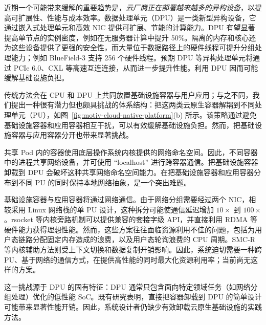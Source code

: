 近期一个可能带来缓解的重要趋势是，\emph{云厂商正在部署越来越多的异构设备}，以提高可扩展性、性能与成本效率\cite{amazon-f1,silberstein2013gpufs,kim2014gpunet,firestone2018azure,china-mobile-smartnic,huawei-smartnic,xilinx-fpga-huawei,ali-fpga,baidu-fpga}。数据处理单元（DPU）是一类新型异构设备，它通过嵌入式处理单元和高效 NIC 提供可扩展、节能的计算能力\cite{234944}。DPU 有望显著提高单节点的实例密度，例如在无服务器计算中提升 50\%\cite{10.1145/3503222.3507732}。隔离的内存和核心还为这些设备提供了更强的安全性，而大量位于数据路径上的硬件线程可提升分组处理能力；例如 BlueField-3 支持 256 个硬件线程\cite{bf-3}。预期 DPU 等异构处理单元将通过 PCIe 6.0、CXL\cite{intel-cxl} 等高速互连连接，从而进一步提升性能。利用 DPU 因而可能缓解基础设施负担。

传统方法会在 CPU 和 DPU 上共同放置基础设施容器与用户应用\cite{redhat-openshift}；与之不同，我们提出一种很有潜力但也颇具挑战的体系结构：把这两类云原生容器解耦到不同处理单元（PU），如图~\ref{fig:motiv-cloud-native-platform}(b) 所示。该策略通过避免基础设施容器和应用容器相互干扰，可以有效缓解基础设施负担。然而，把基础设施容器与应用容器分开也带来显著挑战。

共享 Pod 内的容器使用底层操作系统内核提供的网络命名空间。因此，不同容器中的进程共享网络设备，并可使用 ``localhost'' 进行跨容器通信。把基础设施容器卸载到 DPU 会破坏这种共享网络命名空间能力。在把基础设施容器和应用容器分布到不同 PU 的同时保持本地网络抽象，是一个突出难题。

基础设施容器与应用容器将通过网络通信。由于网络分组需要经过两个 NIC，相较采用 Linux 网络栈的单 PU 设计，这种拆分可能使通信延迟增加 $10\times$ 到 $100\times$。rsocket\cite{rsocket} 等内核旁路机制\cite{10.5555/2616448.2616493,rsocket,f-stack,10.1145/3341302.3342071,libvma}可以提供兼容的套接字级 API，并直接利用 RDMA 等硬件能力获得理想性能。然而，这些方案往往面临资源利用不佳的问题\cite{10.1145/3477132.3483569}，包括为用户态链路分配固定内存造成的浪费，以及用户态轮询浪费的 CPU 周期。SMC-R\cite{rfc7609} 等内核辅助方法则受上下文切换和数据复制开销影响。因此，系统迫切需要一种跨 PU、基于网络的通信方式，在提供高性能的同时最大化资源利用率；当前尚无这样的方案。

这一挑战源于 DPU 的固有特征：DPU 通常只包含面向特定领域任务（如网络分组处理）优化的低性能 SoC。既有研究表明，直接把容器卸载到 DPU 的简单设计可能带来显著性能开销\cite{wei2022comprehensive,10.1145/3477132.3483565,10.1145/3503222.3507732}。因此，系统设计者仍缺少有效卸载云原生基础设施的实践方法。


